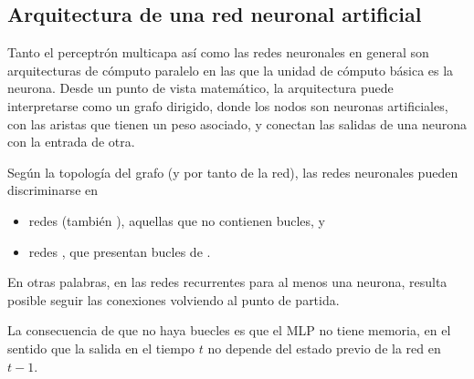 %
%
\subsection{Arquitectura de una red neuronal artificial}
%
Tanto el perceptrón multicapa así como las redes neuronales en general
son arquitecturas de cómputo paralelo en las que la unidad de cómputo
básica es la neurona. Desde un punto de vista matemático, la
arquitectura puede interpretarse como un grafo dirigido, donde los
nodos son neuronas artificiales, con las aristas que tienen un peso
asociado, y conectan las salidas de una neurona con la entrada de
otra.

Según la topología del grafo (y por tanto de la red), las redes
neuronales pueden discriminarse en
%
\begin{itemize}
\item redes  (también ), aquellas que no contienen bucles, y
\item redes , que presentan bucles de
  .
\end{itemize}
%
En otras palabras, en las redes recurrentes para al menos una neurona,
resulta posible seguir las conexiones volviendo al punto de partida.

La consecuencia de que no haya buecles es que el MLP no tiene memoria,
en el sentido que la salida en el tiempo $t$ no depende del estado
previo de la red en $t-1$.





